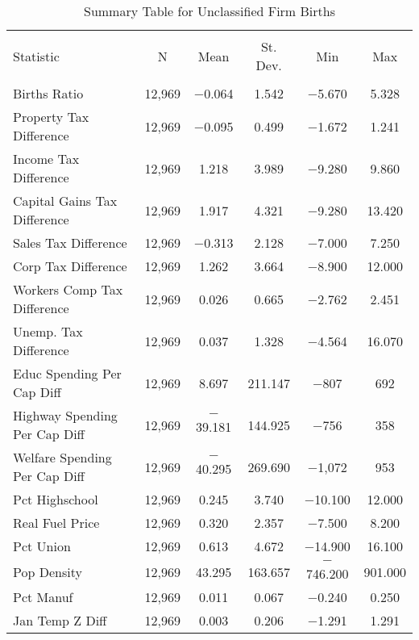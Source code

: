 
\begin{table}[!htbp] \centering 
  \caption{Summary Table for  Unclassified Firm Births} 
  \label{99summary} 
\begin{tabular}{@{\extracolsep{5pt}}lccccc} 
\\[-1.8ex]\hline 
\hline \\[-1.8ex] 
Statistic & \multicolumn{1}{c}{N} & \multicolumn{1}{c}{Mean} & \multicolumn{1}{c}{St. Dev.} & \multicolumn{1}{c}{Min} & \multicolumn{1}{c}{Max} \\ 
\hline \\[-1.8ex] 
Births Ratio & 12,969 & $-$0.064 & 1.542 & $-$5.670 & 5.328 \\ 
Property Tax Difference & 12,969 & $-$0.095 & 0.499 & $-$1.672 & 1.241 \\ 
Income Tax Difference & 12,969 & 1.218 & 3.989 & $-$9.280 & 9.860 \\ 
Capital Gains Tax Difference & 12,969 & 1.917 & 4.321 & $-$9.280 & 13.420 \\ 
Sales Tax Difference & 12,969 & $-$0.313 & 2.128 & $-$7.000 & 7.250 \\ 
Corp Tax Difference & 12,969 & 1.262 & 3.664 & $-$8.900 & 12.000 \\ 
Workers Comp Tax Difference & 12,969 & 0.026 & 0.665 & $-$2.762 & 2.451 \\ 
Unemp. Tax Difference & 12,969 & 0.037 & 1.328 & $-$4.564 & 16.070 \\ 
Educ Spending Per Cap Diff & 12,969 & 8.697 & 211.147 & $-$807 & 692 \\ 
Highway Spending Per Cap Diff & 12,969 & $-$39.181 & 144.925 & $-$756 & 358 \\ 
Welfare Spending Per Cap Diff & 12,969 & $-$40.295 & 269.690 & $-$1,072 & 953 \\ 
Pct Highschool & 12,969 & 0.245 & 3.740 & $-$10.100 & 12.000 \\ 
Real Fuel Price & 12,969 & 0.320 & 2.357 & $-$7.500 & 8.200 \\ 
Pct Union & 12,969 & 0.613 & 4.672 & $-$14.900 & 16.100 \\ 
Pop Density & 12,969 & 43.295 & 163.657 & $-$746.200 & 901.000 \\ 
Pct Manuf & 12,969 & 0.011 & 0.067 & $-$0.240 & 0.250 \\ 
Jan Temp Z Diff & 12,969 & 0.003 & 0.206 & $-$1.291 & 1.291 \\ 

\end{tabular}
\end{table}
